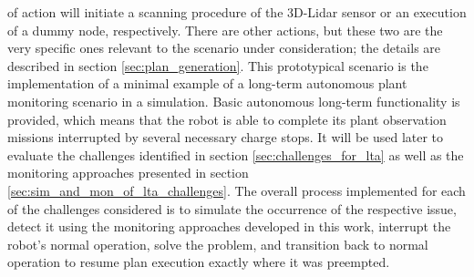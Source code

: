 \documentclass[english, master, utf8]{base/thesis_KBS}
\begin{document}
of action will initiate a scanning procedure of the 3D-Lidar sensor or an execution of a dummy node, respectively. There are other actions, but these two are the very specific ones
relevant to the scenario under consideration; the details are described in section \ref{sec:plan_generation}. This prototypical scenario is the implementation of a minimal 
example of a long-term autonomous plant monitoring scenario in a simulation. Basic autonomous long-term functionality is provided, which means that the robot is able to 
complete its plant observation missions interrupted by several necessary charge stops. It will be used later to evaluate the challenges identified in section 
\ref{sec:challenges_for_lta} as well as the monitoring approaches presented in section \ref{sec:sim_and_mon_of_lta_challenges}.
The overall process implemented for each of the challenges considered is to simulate the occurrence of the respective issue, detect it using
the monitoring approaches developed in this work, interrupt the robot's normal operation, solve the problem, and transition back to normal operation to resume 
plan execution exactly where it was preempted.
\end{document}
